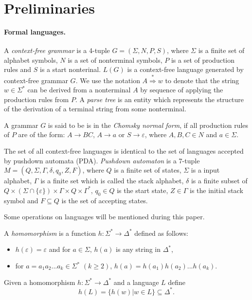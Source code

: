 \section{Preliminaries}
\label{sec:prel}
\label{preliminaries}
\paragraph{Formal languages.} 
A \textit{context-free grammar} is a 4-tuple $G = (\Sigma, N, P, S)$, where $\Sigma$ is a finite set of alphabet symbols,  $N$ is a set of nonterminal symbols, $P$ is a set of production rules and $S$ is a start nonterinal. $L(G)$ is a context-free language generated by context-free grammar $G$. We use the notation $A \stackrel {*}{\Rightarrow } w$  to denote that the string $w \in \Sigma^*$ can be derived from a nonterminal $A$ by sequence of applying the production rules from $P$. A \textit{parse tree} is an entity which represents the structure of the derivation of a terminal string from some nonterminal.


A grammar $G$ is said to be is in the \textit{Chomsky normal form}, if all production rules of $P$ are of the form:
$A \rightarrow BC$, $A \rightarrow a$ or $S \rightarrow \varepsilon$, where $A, B, C \in N$ and $a \in \Sigma$. 


The set of all context-free languages is identical to the set of languages accepted by pushdown automata (PDA). \textit{Pushdown automaton} is a 7-tuple $M = (Q, \Sigma, \Gamma, \delta, q_0, Z, F)$, where $Q$ is a finite set of states, $\Sigma$ is a input alphabet, $\Gamma$ is a finite set which is called the stack alphabet, $\delta$ is a finite subset of $Q \times (\Sigma \cap \{\varepsilon\}) \times \Gamma \times Q \times \Gamma^*$,
$q_{0}\in Q$ is the start state, $Z \in \Gamma$ is the initial stack symbol and
$F\subseteq Q$ is the set of accepting states.


Some operations on languages will be mentioned during this paper.


A \textit{homomorphism} is a function $h: \Sigma^* \rightarrow \Delta^*$ defined as follows: 
\begin{itemize}
\item $h(\varepsilon) = \varepsilon$ and for $a \in \Sigma$, $h(a)$ is any string in $\Delta^*$,
\item for $a = a_1a_2 ... a_k \in \Sigma^*$ $(k \ge 2)$, $h(a) = h(a_1)h(a_2)... h(a_k)$.
\end{itemize}
Given a homomorphism $h: \Sigma^* \rightarrow \Delta^*$ and a language $L$ define 
$$h(L)= \{h(w) | w \in L\} \subseteq \Delta^*.$$

